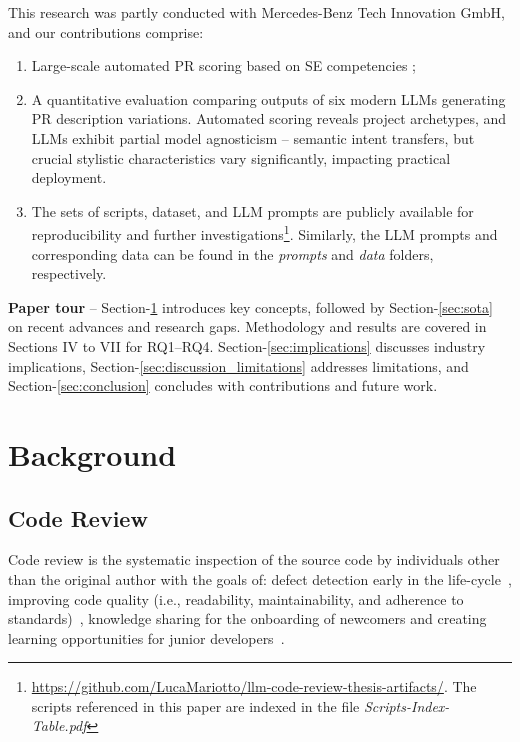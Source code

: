 \documentclass[conference]{IEEEtran}
\begin{document}
This research was partly conducted with Mercedes-Benz Tech Innovation GmbH, and our contributions comprise: 
\begin{enumerate}
    \item Large-scale automated PR scoring based on SE competencies \cite{wurzel2023competencies}; 
    \item A quantitative evaluation comparing outputs of six modern LLMs generating PR description variations. Automated scoring reveals project archetypes, and LLMs exhibit partial model agnosticism – semantic intent transfers, but crucial stylistic characteristics vary significantly, impacting practical deployment.
    \item The sets of scripts, dataset, and LLM prompts are publicly available for reproducibility and further investigations\footnote{\url{https://github.com/LucaMariotto/llm-code-review-thesis-artifacts/}. The scripts referenced in this paper are indexed in the file \textit{Scripts-Index-Table.pdf}}. Similarly, the LLM prompts and corresponding data can be found in the \textit{prompts} and \textit{data} folders, respectively.
\end{enumerate}

\textbf{Paper tour} --  Section-\ref{sec:background} introduces key concepts, followed by Section-\ref{sec:sota} on recent advances and research gaps. Methodology and results are covered in Sections IV to VII for RQ1–RQ4. Section-\ref{sec:implications} discusses industry implications, Section-\ref{sec:discussion_limitations} addresses limitations, and Section-\ref{sec:conclusion} concludes with contributions and future work.


\section{Background}\label{sec:background}

\subsection{Code Review}
Code review is the systematic inspection of the source code by individuals other than the original author with the goals of: defect detection early in the life-cycle~\cite{bavota2015four}, improving code quality (i.e., readability, maintainability, and adherence to standards)~\cite{gousios2015work}, knowledge sharing for  the onboarding of newcomers and creating learning opportunities for junior developers~\cite{bacchelli2013expectations, bosu2013building}. 
\end{document}
